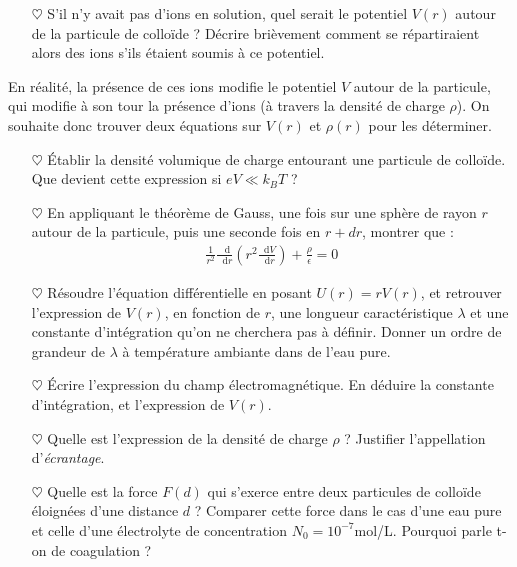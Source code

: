 \documentclass{report}
\newcommand*\dif{\mathop{}\!\mathrm{d}}
\begin{document}

\begin{itemize}

	\item[$\heartsuit$] S'il n'y avait pas d'ions en solution, quel serait le potentiel $V(r)$ autour de la particule de colloïde ? Décrire brièvement comment se répartiraient alors des ions s'ils étaient soumis à ce potentiel.

\end{itemize}

En réalité, la présence de ces ions modifie le potentiel $V$ autour de la particule, qui modifie à son tour la présence d'ions (à travers la densité de charge $\rho$). On souhaite donc trouver deux équations sur $V(r)$ et $\rho(r)$ pour les déterminer. 

\begin{itemize}

	\item[$\heartsuit$] Établir la densité volumique de charge entourant une particule de colloïde. Que devient cette expression si $eV\ll k_BT$ ?
	
	\item[$\heartsuit$] En appliquant le théorème de Gauss, une fois sur une sphère de rayon $r$ autour de la particule, puis une seconde fois en $r+dr$, montrer que : 
	\begin{align*}
		\frac{1}{r^2}\frac{\dif}{\dif r}\left( r^2\frac{\dif V}{\dif r}\right) +\frac{\rho}{\epsilon}=0
	\end{align*}

	\item[$\heartsuit$] Résoudre l'équation différentielle en posant $U(r)=rV(r)$, et retrouver l'expression de $V(r)$, en fonction de $r$, une longueur caractéristique $\lambda$ et une constante d'intégration qu'on ne cherchera pas à définir. Donner un ordre de grandeur de $\lambda$ à température ambiante dans de l'eau pure.
	
	\item[$\heartsuit$] Écrire l'expression du champ électromagnétique. En déduire la constante d'intégration, et l'expression de $V(r)$. 
	
	\item[$\heartsuit$] Quelle est l'expression de la densité de charge $\rho$ ? Justifier l'appellation d'\textit{écrantage}.
	
	\item[$\heartsuit$] Quelle est la force $F(d)$ qui s'exerce entre deux particules de colloïde éloignées d'une distance $d$ ? Comparer cette force dans le cas d'une eau pure et celle d'une électrolyte de concentration $N_0=10^{-7}$mol/L. Pourquoi parle t-on de coagulation ?

\end{itemize} 
\end{document}
